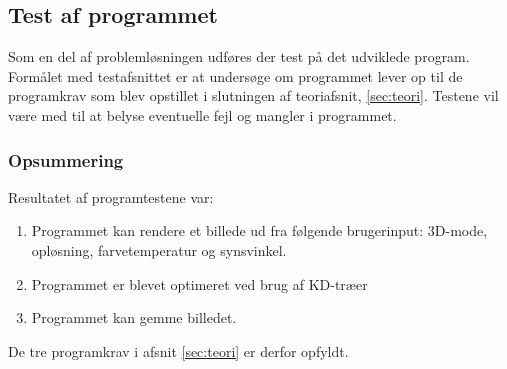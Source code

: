 \subsection{Test af programmet}

Som en del af problemløsningen udføres der test på det udviklede program. Formålet med testafsnittet er at undersøge om programmet lever op til de programkrav som blev opstillet i slutningen af teoriafsnit, \ref{sec:teori}. Testene vil være med til at belyse eventuelle fejl og mangler i programmet.





\subsubsection*{Opsummering}
Resultatet af programtestene var:

\begin{enumerate}
    \item Programmet kan rendere et billede ud fra følgende brugerinput: 3D-mode, opløsning, farvetemperatur og synsvinkel.
    \item Programmet er blevet optimeret ved brug af KD-træer
    \item Programmet kan gemme billedet.
\end{enumerate}

De tre programkrav i afsnit \ref{sec:teori} er derfor opfyldt.

